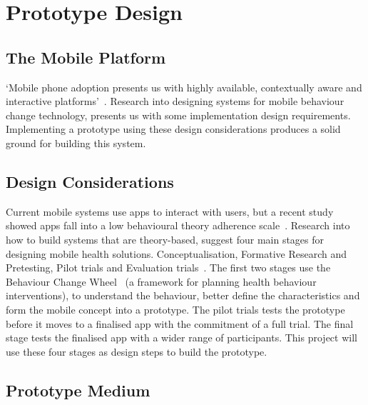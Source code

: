 
\newpage
\section{Prototype Design}

\subsection{The Mobile Platform}

`Mobile phone adoption presents us with highly available, contextually aware and interactive platforms'~\cite{article_mhealth}.
Research into designing systems for mobile behaviour change technology, presents us with some implementation design requirements.
Implementing a prototype using these design considerations produces a solid ground for building this system.\newline
\newline

\subsection{Design Considerations}

Current mobile systems use apps to interact with users, but a recent study showed apps fall into a low behavioural theory adherence scale~\cite{article_mhealth}.
Research into how to build systems that are theory-based, suggest four main stages for designing mobile health solutions. Conceptualisation, Formative Research and Pretesting,
Pilot trials and Evaluation trials~\cite{article_mhealth}. The first two stages use the Behaviour Change Wheel~\cite{article_behaviour_change_wheel}
(a framework for planning health behaviour interventions), to understand the behaviour, better define the characteristics and form the mobile concept into a prototype.
The pilot trials tests the prototype before it moves to a finalised app with the commitment of a full trial. The final stage tests the finalised app with a wider range of participants.
This project will use these four stages as design steps to build the prototype.\newline
\newline

\subsection{Prototype Medium}


